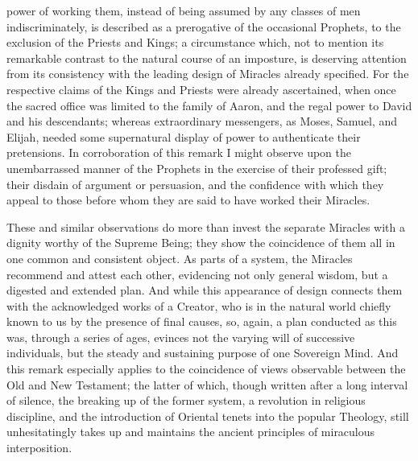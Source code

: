 power of working them, instead of being assumed by any classes of men
indiscriminately, is described as a prerogative of the occasional
Prophets, to the exclusion of the Priests and Kings; a circumstance
which, not to mention its remarkable contrast to the natural course of
an imposture, is deserving attention from its consistency with the
leading design of Miracles already specified. For the respective
claims of the Kings and Priests were already ascertained, when once
the sacred office was limited to the family of Aaron, and the regal
power to David and his descendants; whereas extraordinary messengers,
as Moses, Samuel, and Elijah, needed some supernatural display of
power to authenticate their pretensions. In corroboration of this
remark I might observe upon the unembarrassed manner of the Prophets
in the exercise of their professed gift; their disdain of argument or
persuasion, and the confidence with which they appeal to those before
whom they are said to have worked their Miracles.

These and similar observations do more than
invest the separate Miracles with a dignity worthy of the Supreme
Being; they show the coincidence of them all in one common and
consistent object. As parts of a system, the Miracles recommend and
attest each other, evidencing not only general wisdom, but a digested
and extended plan. And while this appearance of design connects
them with the acknowledged works of a Creator, who is in the natural
world chiefly known to us by the presence of final causes, so, again,
a plan conducted as this was, through a series of ages, evinces not
the varying will of successive individuals, but the steady and
sustaining purpose of one Sovereign Mind. And this remark especially
applies to the coincidence of views observable between the Old and New
Testament; the latter of which, though written after a long interval
of silence, the breaking up of the former system, a revolution in
religious discipline, and the introduction of Oriental tenets into the
popular Theology, still unhesitatingly takes up and maintains the
ancient principles of miraculous interposition.

